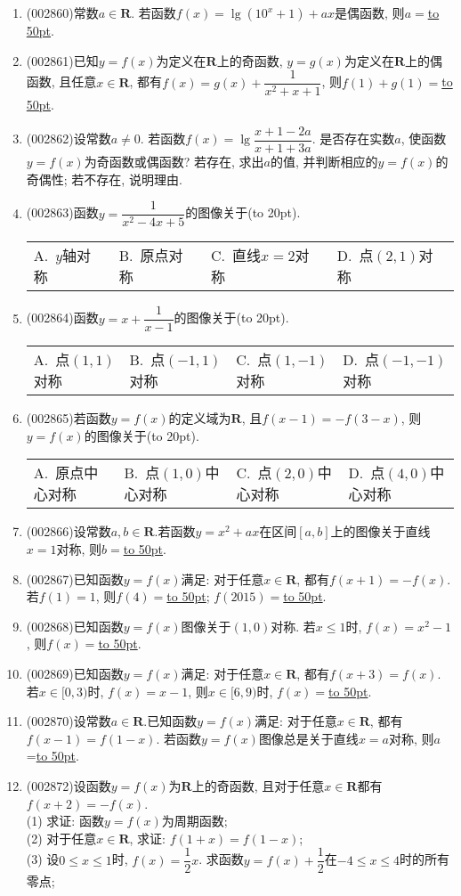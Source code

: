 \documentclass[10pt,a4paper]{article}
\newcommand{\blank}[1]{\underline{\hbox to #1pt{}}}
\newcommand{\bracket}[1]{(\hbox to #1pt{})}
\newcommand{\fourch}[4]{\par\begin{tabular}{p{.23\textwidth}p{.23\textwidth}p{.23\textwidth}p{.23\textwidth}}
A.~#1 &B.~#2& C.~#3& D.~#4
\end{tabular}}
\begin{document}
\begin{enumerate}[1.]
\item {\tiny (002860)}常数$a\in \mathbf{R}$. 若函数$f(x)=\lg(10^x+1)+ax$是偶函数, 则$a=$\blank{50}.
\item {\tiny (002861)}已知$y=f(x)$为定义在$\mathbf{R}$上的奇函数, $y=g(x)$为定义在$\mathbf{R}$上的偶函数, 且任意$x\in \mathbf{R}$, 都有$f(x)=g(x)+\dfrac{1}{x^2+x+1}$, 则$f(1)+g(1)=$\blank{50}.
\item {\tiny (002862)}设常数$a\ne 0$. 若函数$f(x)=\lg \dfrac{x+1-2a}{x+1+3a}$. 是否存在实数$a$, 使函数$y=f(x)$为奇函数或偶函数? 若存在, 求出$a$的值, 并判断相应的$y=f(x)$的奇偶性; 若不存在, 说明理由.
\item {\tiny (002863)}函数$y=\dfrac 1{x^2-4x+5}$的图像关于\bracket{20}.
\fourch{$y$轴对称}{原点对称}{直线$x=2$对称}{点$(2,1)$对称}
\item {\tiny (002864)}函数$y=x+\dfrac 1{x-1}$的图像关于\bracket{20}.
\fourch{点$(1,1)$对称}{点$(-1,1)$对称}{点$(1,-1)$对称}{点$(-1,-1)$对称}
\item {\tiny (002865)}若函数$y=f(x)$的定义域为$\mathbf{R}$, 且$f(x-1)=-f(3-x)$, 则$y=f(x)$的图像关于\bracket{20}.
\fourch{原点中心对称}{点$(1,0)$中心对称}{点$(2,0)$中心对称}{点$(4,0)$中心对称}
\item {\tiny (002866)}设常数$a,b\in \mathbf{R}$.若函数$y=x^2+ax$在区间$[a,b]$上的图像关于直线$x=1$对称, 则$b=$\blank{50}.
\item {\tiny (002867)}已知函数$y=f(x)$满足: 对于任意$x\in \mathbf{R}$, 都有$f(x+1)=-f(x)$. 若$f(1)=1$, 则$f(4)=$\blank{50}; $f(2015)=$\blank{50}.
\item {\tiny (002868)}已知函数$y=f(x)$图像关于$(1,0)$对称. 若$x\le 1$时, $f(x)=x^2-1$, 则$f(x)=$\blank{50}.
\item {\tiny (002869)}已知函数$y=f(x)$满足: 对于任意$x\in \mathbf{R}$, 都有$f(x+3)=f(x)$. 若$x\in [0,3)$时, $f(x)=x-1$, 则$x\in [6,9)$时, $f(x)=$\blank{50}.
\item {\tiny (002870)}设常数$a\in \mathbf{R}$.已知函数$y=f(x)$满足: 对于任意$x\in \mathbf{R}$, 都有$f(x-1)=f(1-x)$. 若函数$y=f(x)$图像总是关于直线$x=a$对称, 则$a$=\blank{50}.
\item {\tiny (002872)}设函数$y=f(x)$为$\mathbf{R}$上的奇函数, 且对于任意$x\in \mathbf{R}$都有$f(x+2)=-f(x)$.\\
(1) 求证: 函数$y=f(x)$为周期函数;\\
(2) 对于任意$x\in \mathbf{R}$, 求证: $f(1+x)=f(1-x)$;\\
(3) 设$0\le x\le 1$时, $f(x)=\dfrac 12x$. 求函数$y=f(x)+\dfrac 12$在$-4\le x\le 4$时的所有零点;\\

\end{enumerate}
\end{document}
